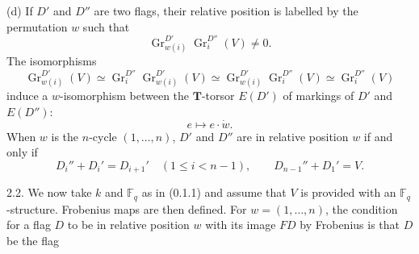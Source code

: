 \documentclass[9pt,twoside]{extarticle}
\begin{document}
{(d) If \(D'\) and \(D''\) are two flags, their relative position is labelled by the permutation \(w\) such that \[
\operatorname{Gr}_{w(i)}^{D'}\operatorname{Gr}_i^{D''}(V)\ne0.
\] The isomorphisms \[
\operatorname{Gr}_{w(i)}^{D'}(V)
\simeq\operatorname{Gr}_i^{D''}\operatorname{Gr}_{w(i)}^{D'}(V)
\simeq\operatorname{Gr}_{w(i)}^{D'}\operatorname{Gr}_i^{D''}(V)
\simeq\operatorname{Gr}_i^{D''}(V)
\] induce a \(w\)-isomorphism between the \(\mathbf T\)-torsor \(E(D')\) of markings of \(D'\) and \(E(D'')\): \[
e\longmapsto e\cdot\dot w.
\] When \(w\) is the \(n\)-cycle \((1,\ldots,n)\), \(D'\) and \(D''\) are in relative position \(w\) if and only if \[
D_i''+D_i'=D_{i+1}'\quad(1\le i<n-1),
\qquad
D_{n-1}''+D_1'=V.
\]\par

2.2. We now take \(k\) and \(\mathbb F_q\) as in (0.1.1) and assume that \(V\) is provided with an \(\mathbb F_q\)-structure. Frobenius maps are then defined. For \(w=(1,\ldots,n)\), the condition for a flag \(D\) to be in relative position \(w\) with its image \(FD\) by Frobenius is that \(D\) be the flag\par
}
\end{document}
